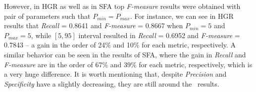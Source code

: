 However, in HGR as well as in SFA top \emph{F-measure} results were obtained with pair of parameters such that $P_{min} = P_{max}$. For instance, we can see in HGR results that \emph{Recall} = 0.8641 and \emph{F-measure} = 0.8667 when $P_{min} = 5$ and $P_{max} = 5$, while $[5, 95]$ interval resulted in \emph{Recall} = 0.6952 and \emph{F-measure} = 0.7843 -- a gain in the order of 24\% and 10\% for each metric, respectively. A similar behavior can be seen in the results of SFA, where the gain in \emph{Recall} and \emph{F-measure} are in the order of 67\% and 39\% for each metric, respectively, which is a very huge difference. It is worth mentioning that, despite \emph{Precision} and \emph{Specificity} have a slightly decreasing, they are still around the~\citet{brancati:17} results.



